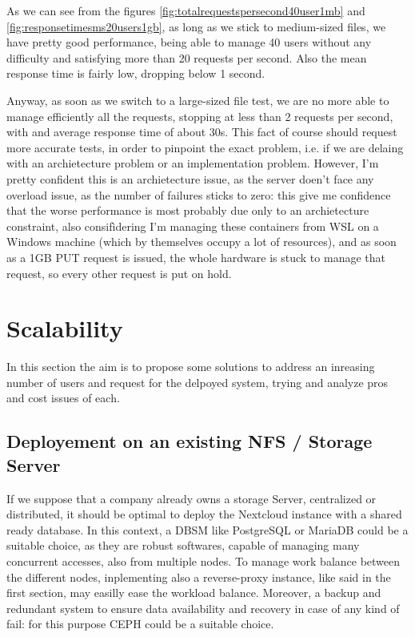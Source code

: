\documentclass{article}
\begin{document}
	As we can see from the figures \ref{fig:totalrequestspersecond40user1mb} and \ref{fig:responsetimesms20users1gb}, as long as we stick to medium-sized files, we have pretty good performance, being able to manage 40 users without any difficulty and satisfying more than 20 requests per second. Also the mean response time is fairly low, dropping below 1 second.
	
	Anyway, as soon as we switch to a large-sized file test, we are no more able to manage efficiently all the requests, stopping at less than 2 requests per second, with and average response time of about 30s. This fact of course should request more accurate tests, in order to pinpoint the exact problem, i.e. if we are delaing with an archietecture problem or an implementation problem. However, I'm pretty confident this is an archietecture issue, as the server doen't face any overload issue, as the number of failures sticks to zero: this give me confidence that the worse performance is most probably due only to an archietecture constraint, also consifìdering I'm managing these containers from WSL on a Windows machine (which by themselves occupy a lot of resources), and as soon as a 1GB PUT request is issued, the whole hardware is stuck to manage that request, so every other request is put on hold.
	
	\section{Scalability}
	\label{sec:scalability}
	In this section the aim is to propose some solutions to address an inreasing number of users and request for the delpoyed system, trying and analyze pros and cost issues of each.
	
	\subsection{Deployement on an existing NFS / Storage Server}
	If we suppose that a company already owns a storage Server, centralized or distributed, it should be optimal to deploy the Nextcloud instance with a shared ready database. In this context, a DBSM like PostgreSQL or MariaDB could be a suitable choice, as they are robust softwares, capable of managing many concurrent accesses, also from multiple nodes. To manage work balance between the different nodes, inplementing also a reverse-proxy instance, like said in the first section, may easilly ease the workload balance. Moreover, a backup and redundant system to ensure data availability and recovery in case of any kind of fail: for this purpose CEPH could be a suitable choice.
	
\end{document}
